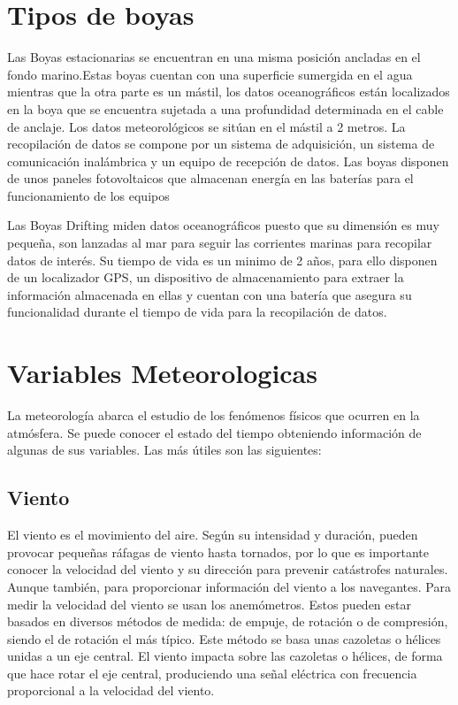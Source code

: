 \documentclass[12pt]{book}
\begin{document}
\section{Tipos de boyas}

Las  Boyas estacionarias  se encuentran en una misma posición ancladas  en el fondo marino.Estas boyas cuentan con una superficie sumergida en el agua mientras que la otra parte es un mástil, los datos oceanográficos están localizados en la boya que se encuentra sujetada a una profundidad determinada en el cable de anclaje. Los datos meteorológicos se sitúan en el mástil a 2 metros. La recopilación de datos se compone por un sistema de adquisición, un sistema de comunicación inalámbrica y un equipo de recepción de datos. Las boyas disponen de unos paneles fotovoltaicos  que almacenan energía en las baterías para el funcionamiento de los equipos

Las Boyas Drifting miden datos oceanográficos puesto que su dimensión es muy pequeña, son lanzadas al mar para seguir las corrientes marinas para recopilar datos de interés. Su tiempo de vida es un minimo de 2 años, para ello disponen de un localizador GPS, un dispositivo de almacenamiento para extraer la información almacenada en ellas y cuentan con una batería que asegura su funcionalidad durante el tiempo de vida para la recopilación de datos.\cite{Tboyas}
  
\section{Variables Meteorologicas}
La meteorología abarca el estudio de los fenómenos físicos que ocurren en la atmósfera. Se puede conocer el estado del tiempo obteniendo información de algunas de sus variables. Las más útiles son las siguientes:
\subsection{ Viento}
El viento es el movimiento del aire. Según su intensidad y duración, pueden provocar pequeñas ráfagas de viento hasta tornados, por lo que es importante conocer la velocidad del viento y su dirección para prevenir catástrofes naturales.
Aunque también, para proporcionar información del viento a los navegantes. Para medir la velocidad del viento se usan los anemómetros. Estos pueden estar basados en diversos métodos de medida: de empuje, de rotación o de compresión, siendo el de rotación el más típico. Este método se basa unas cazoletas o hélices unidas a un eje central. El viento impacta sobre las cazoletas o hélices, de forma que hace rotar el eje central, produciendo una señal eléctrica con frecuencia proporcional a la velocidad del viento.
\end{document}
